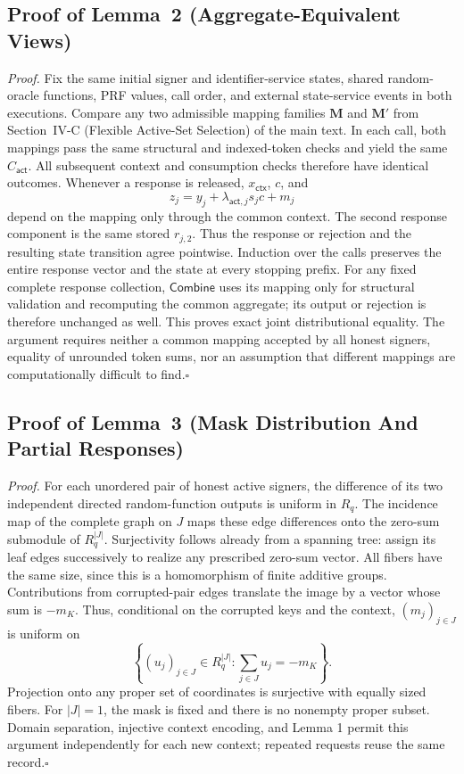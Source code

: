 \documentclass[lettersize,journal]{IEEEtran}
\begin{document}
	\subsection{Proof of Lemma~2 (Aggregate-Equivalent Views)}
	\label{app:talon-lemma2-proof}
	
	{
		\emph{Proof.}
		Fix the same initial signer and identifier-service states, shared
		random-oracle functions, PRF values, call order, and external state-service
		events in both executions. Compare any two admissible mapping families
		$\mathbf M$ and $\mathbf M'$ from
		Section~IV-C (Flexible Active-Set Selection) of the main text. In each call, both
		mappings pass the same structural and indexed-token checks and yield the
		same $C_{\mathsf{act}}$. All subsequent context and consumption checks
		therefore have identical outcomes. Whenever a response is released,
		$x_{\mathsf{ctx}}$, $c$, and
		\[
		z_j=y_j+\lambda_{\mathsf{act},j}s_jc+m_j
		\]
		depend on the mapping only through the common context. The second response
		component is the same stored $r_{j,2}$. Thus the response or rejection and
		the resulting state transition agree pointwise. Induction over the calls
		preserves the entire response vector and the state at every stopping prefix.
		For any fixed complete response collection, $\mathsf{Combine}$ uses its
		mapping only for structural validation and recomputing the common aggregate;
		its output or rejection is therefore unchanged as well. This proves exact
		joint distributional equality. The argument requires neither a common
		mapping accepted by all honest signers, equality of unrounded token sums,
		nor an assumption that different mappings are computationally difficult
		to find.\hfill$\square$
	}
	
	\subsection{Proof of Lemma~3 (Mask Distribution And Partial Responses)}
	\label{app:talon-lemma3-proof}
	
	\emph{Proof.}
	For each unordered pair of honest active signers, the difference of its two
	independent directed random-function outputs is uniform in $R_q$. The
	incidence map of the complete graph on $J$ maps these edge differences onto
	the zero-sum submodule of $R_q^{|J|}$. Surjectivity follows already from a
	spanning tree: assign its leaf edges successively to realize any prescribed
	zero-sum vector. All fibers have the same size, since this is a homomorphism
	of finite additive groups. Contributions from corrupted-pair edges translate
	the image by a vector whose sum is $-m_K$. Thus, conditional on the
	corrupted keys and the context, $(m_j)_{j\in J}$ is uniform on
	\[
	\left\{(u_j)_{j\in J}\in R_q^{|J|}:
	\sum_{j\in J}u_j=-m_K\right\}.
	\]
	Projection onto any proper set of coordinates
	is surjective with equally sized fibers. For $|J|=1$, the mask is fixed and
	there is no nonempty proper subset. Domain separation, injective context
	encoding, and Lemma 1 permit this argument independently for each new
	context; repeated requests reuse the same record.\hfill$\square$
	
\end{document}
